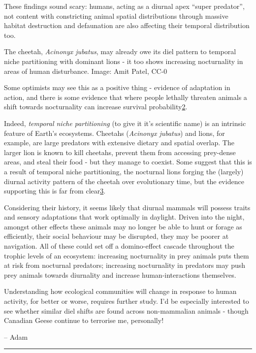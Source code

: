 \documentclass[]{article}
\begin{document}
These findings sound scary: humans, acting as a diurnal apex ``super
predator'', not content with constricting animal spatial distributions
through massive habitat destruction and defaunation are also affecting
their temporal distribution too.

The cheetah, \emph{Acinonyx jubatus}, may already owe its diel pattern
to temporal niche partitioning with dominant lions - it too shows
increasing nocturnality in areas of human disturbance. Image: Amit
Patel, CC-0

Some optimists may see this as a positive thing - evidence of adaptation
in action, and there is some evidence that where people lethally
threaten animals a shift towards nocturnality can increase survival
probability\protect\hyperlink{f2}{2}.

Indeed, \emph{temporal niche partitioning} (to give it it's scientific
name) is an intrinsic feature of Earth's ecosystems. Cheetahs
(\emph{Acinonyx jubatus}) and lions, for example, are large predators
with extensive dietary and spatial overlap. The larger lion is known to
kill cheetahs, prevent them from accessing prey-dense areas, and steal
their food - but they manage to coexist. Some suggest that this is a
result of temporal niche partitioning, the nocturnal lions forging the
(largely) diurnal activity pattern of the cheetah over evolutionary
time, but the evidence supporting this is far from
clear\protect\hyperlink{f3}{3}.

Considering their history, it seems likely that diurnal mammals will
possess traits and sensory adaptations that work optimally in daylight.
Driven into the night, amongst other effects these animals may no longer
be able to hunt or forage as efficiently, their social behaviour may be
disrupted, they may be poorer at navigation. All of these could set off
a domino-effect cascade throughout the trophic levels of an ecosystem:
increasing nocturnality in prey animals puts them at risk from nocturnal
predators; increasing nocturnality in predators may push prey animals
towards diurnality and increase human-interactions themselves.

Understanding how ecological communities will change in response to
human activity, for better or worse, requires further study. I'd be
especially interested to see whether similar diel shifts are found
across non-mammalian animals - though Canadian Geese continue to
terrorise me, personally!

-- Adam

\begin{center}\rule{0.5\linewidth}{\linethickness}\end{center}
\end{document}
